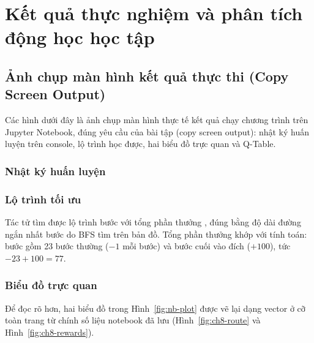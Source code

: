 \chapter{Kết quả thực nghiệm và phân tích động học học tập}

\section{Ảnh chụp màn hình kết quả thực thi (Copy Screen Output)}
Các hình dưới đây là ảnh chụp màn hình thực tế kết quả chạy chương trình trên Jupyter Notebook, đúng yêu cầu của bài
tập (copy screen output): nhật ký huấn luyện trên console, lộ trình học được, hai biểu đồ trực quan và Q-Table.

\subsection{Nhật ký huấn luyện}

\subsection{Lộ trình tối ưu}

Tác tử tìm được lộ trình  bước với tổng phần thưởng
, đúng bằng độ dài đường ngắn nhất  bước do BFS
tìm trên bản đồ. Tổng phần thưởng khớp với tính toán:  bước gồm 23 bước thường
($-1$ mỗi bước) và bước cuối vào đích ($+100$), tức $-23 + 100 = 77$.

\subsection{Biểu đồ trực quan}

Để đọc rõ hơn, hai biểu đồ trong Hình~\ref{fig:nb-plot} được vẽ lại dạng vector ở cỡ toàn trang từ chính số liệu notebook
đã lưu (Hình~\ref{fig:ch8-route} và Hình~\ref{fig:ch8-rewards}).

